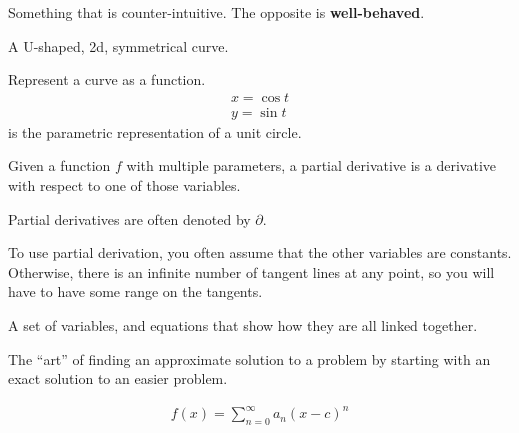 \begin{definition}[Pathological]
    Something that is counter-intuitive. The opposite is \textbf{well-behaved}.

\end{definition}

\begin{definition}[Parabola]
    A U-shaped, 2d, symmetrical curve.
\end{definition}

\begin{definition}[Parameterization]
    Represent a curve as a function.
    \begin{align}
        x = \cos{t} \\
        y = \sin{t}
    \end{align}
    is the parametric representation of a unit circle.

\begin{definition}
    Given a function $f$ with multiple parameters, a partial derivative is a
    derivative with respect to one of those variables.

    Partial derivatives are often denoted by $\partial$.

    To use partial derivation, you often assume that the other variables are 
    constants. Otherwise, there is an infinite number of tangent lines at
    any point, so you will have to have some range on the tangents.

\end{definition}

\end{definition}

\begin{definition}
    A set of variables, and equations that show how they are all linked 
    together.
\end{definition}

\begin{definition}\label{pertubation}
    The ``art'' of finding an approximate solution to a problem by starting
    with an exact solution to an easier problem.
\end{definition}


\begin{definition}\label{powerseries}
    \begin{align}
        f(x) = \sum\limits_{n=0}^{\infty}{a_{n}{(x-c)}^{n}}
    \end{align}
\end{definition}

